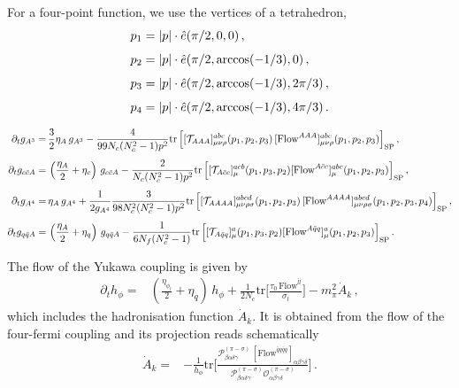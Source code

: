 \documentclass[aps,twocolumn,prd,superscriptaddress]{revtex4-2}
\begin{document}
For a four-point function, we use the vertices of a tetrahedron, 
\begin{align}\notag 
	p_1 &= |p|\cdot \hat e (\pi/2, 0, 0)\,,          	\\[1ex] \notag
	p_2 &= |p|\cdot \hat e (\pi/2, \arccos(-1/3), 0)\,,    \\[1ex] \notag
	p_3 &= |p|\cdot \hat e (\pi/2, \arccos(-1/3), 2\pi/3)\,,    \\[1ex]
	p_4 &= |p|\cdot \hat e (\pi/2, \arccos(-1/3), 4\pi/3)\,.
\end{align}

%
\begin{widetext}
%
\begin{align}
	\partial_t g_{A^3} =&\,\frac{3}{2}\eta_A\, g_{A^3} - \frac{4}{99 N_c (N_c^2-1) p^2}
	{\textrm{tr}}\,\Big[
	[\mathcal{T}_{AAA}]^{abc}_{\mu\nu\rho}(p_1,p_2,p_3)\, [\textrm{Flow}^{AAA}]^{abc}_{\mu\nu\rho}(p_1,p_2,p_3)
	\Big]_{\textrm{SP}} \,,
	\notag\\[1ex]
	\partial_t g_{c\bar cA} =&\,\left(\frac{\eta_A}{2} + \eta_c \right)\, g_{c\bar cA} -\frac{2}{N_c(N_c^2-1)p^2} 
	  {\textrm{tr}}\,\Big[
	[\mathcal{T}_{A\bar cc}]^{acb}_{\mu}(p_1,p_3,p_2) [\textrm{Flow}^{A\bar cc}]_\mu^{abc}(p_1,p_2,p_3)
	\Big]_{\textrm{SP}}\,,
	\notag\\[1ex]
	\partial_t g_{A^4} =&\,\eta_A\, g_{A^4} + \frac{1}{2 g_{A^4}} \frac{3}{98 N_c^2 (N_c^2-1) p^2}
	  {\textrm{tr}}\,\Big[
	[\mathcal{T}_{AAAA}]^{abcd}_{\mu\nu\rho\sigma}(p_1,p_2,p_3)\, [\textrm{Flow}^{AAAA}]^{abcd}_{\mu\nu\rho\sigma}(p_1,p_2,p_3,p_4)
	\Big]_{\textrm{SP}}\,,
	\notag\\[1ex]
	\partial_t g_{q\bar qA}=&\,\left(\frac{\eta_A}{2} + \eta_q \right)\, g_{q\bar qA} -\frac{1}{6 N_f (N_c^2-1)} 
	{\textrm{tr}}
	\,\Big[
	[\mathcal{T}_{A\bar qq}]^{a}_{\mu}(p_1,p_3,p_2) [\textrm{Flow}^{A\bar qq}]_\mu^a(p_1,p_2,p_3)
	\Big]_{\textrm{SP}}\,.
\end{align}
%
\end{widetext}
%
The flow of the Yukawa coupling is given by
%
\begin{align}
	\partial_t h_\phi = & \left(\frac{\eta_{\phi_l}}{2}+ \eta_q\right)\, h_\phi + \frac{1}{2 N_c}{\textrm{tr}}\Bigg[
		\frac{\tau_0\,\textrm{Flow}^{\bar ll}}{\sigma_l}
		\Bigg] - m_\pi^2 \dot{A}_k\,,
\end{align}
%
which includes the hadronisation function $\dot{{A}}_k$. It is obtained from the flow of the four-fermi coupling and its projection reads schematically
%
\begin{align}
	\dot{A}_k = & - \frac{1}{ h_\phi}{\textrm{tr}}\Bigg[
		\frac{\mathcal{P}^{\scriptscriptstyle(\pi-\sigma)}_{\beta\alpha\delta\gamma}\,[\textrm{Flow}^{\bar qq\bar qq}]_{\alpha\beta\gamma\delta}}{\mathcal{P}^{\scriptscriptstyle(\pi-\sigma)}_{\beta\alpha\delta\gamma}\mathcal{O}^{\scriptscriptstyle(\pi-\sigma)}_{\alpha\beta\gamma\delta}}
		\Bigg]\,.
\end{align}
\end{document}
